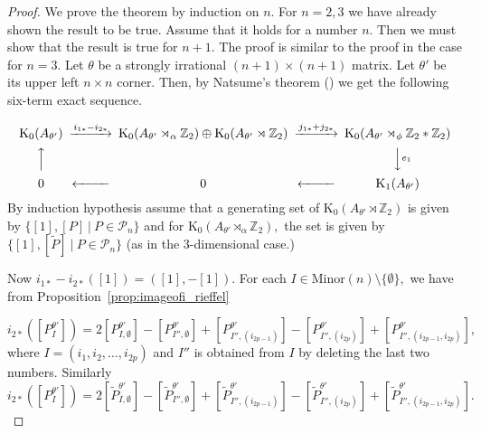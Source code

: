 \documentclass[9pt, BCOR=2mm]{amsart}
\numberwithin{equation}{section}
\numberwithin{equation}{section}
\newcommand{\Z}{{\mathbb{Z}}}
\newcommand{\K}{\mathrm{K}} %
\begin{document}
  \begin{proof}
  	We prove the theorem by induction on $n.$  For $n=2,3$ we have already shown the result to be true. Assume that it holds for a number $n.$ Then we must show that the result is true for $n+1.$ The proof is similar to the proof in the case for $n=3$. Let $\theta$ be a strongly irrational $(n+1)\times (n+1)$ matrix. Let $\theta'$ be its upper left $n \times n$ corner. Then, by Natsume's theorem (\cite{Nat85}) we get the following six-term exact sequence.
 
 {\[
\begin{CD}
\K_0 (A_{\theta'}) @>{i_{1*}-i_{2*}}>>\K_0 (A_{\theta'}\rtimes_\alpha  \Z_2)\oplus \K_0 (A_{\theta'}\rtimes\Z_2)@>{j_{1*}+j_{2*}}>> \K_0 (A_{\theta'}\rtimes_\phi \Z_2*\Z_2)   \\
@A{}AA & &  @VV{e_1}V            \\
 0 @<<{}<  0 @<<{}< \K_1 (A_{\theta'})
\end{CD}
\]} 
 By induction hypothesis assume that a generating set  of $\K_0(A_{\theta'}\rtimes\Z_2)$ is  given by 
 $\{[1], [P] ~|~ P\in \mathcal{P}_n\}$ and  for $\K_0(A_{\theta'}\rtimes_\alpha \Z_2),$ the set is  given by 
 $\{[1], [\tilde P] ~|~ P\in \mathcal{P}_n\}$ (as in the 3-dimensional case.)
 
 Now $i_{1*}-i_{2*}([1])=([1],-[1]).$ For each $I\in \mathrm{Minor}(n)\setminus \{\emptyset\},$ we have from Proposition~\ref{prop:imageofi_rieffel}
 
 $$i_{2*}([P_I^{\theta'}])=	2[P_{I,\emptyset} ^{\theta'}]-[P_{I'',\emptyset} ^{\theta'}]+[P_{I'',(i_{2p-1})} ^{\theta'}]-[P_{I'', (i_{2p})} ^{\theta'}]+[P_{I'', (i_{2p-1},i_{2p})} ^{\theta'}],$$ where $I=(i_1,i_2,\dots,i_{2p})$ and $I''$ is obtained from $I$ by deleting the last two numbers.
 Similarly 
  $$i_{2*}([P_I^{\theta'}])=	2[\tilde P_{I,\emptyset} ^{\theta'}]-[\tilde P_{I'',\emptyset} ^{\theta'}]+[\tilde P_{I'',(i_{2p-1})} ^{\theta'}]-[\tilde P_{I'', (i_{2p})} ^{\theta'}]+[\tilde P_{I'', (i_{2p-1},i_{2p})} ^{\theta'}].$$ 
  

\end{proof}
\end{document}
